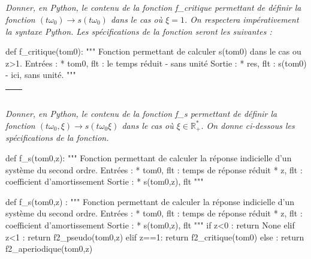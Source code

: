 \documentclass[10pt]{article}
\newif\ifprof
\begin{document}
\subparagraph{} \textit{Donner, en Python, le contenu de la fonction \textsf{f\_critique} permettant de définir la fonction $(t\omega_0) \rightarrow s(t\omega_0)$ dans le cas où $\xi=1$. On respectera impérativement la syntaxe Python. Les spécifications de la fonction seront les suivantes : }
\ifprof
\else
\begin{py}
\begin{python}
def f_critique(tom0):
    """
    Fonction permettant de calculer s(tom0) dans le cas ou z>1. 
    Entrées :
        * tom0, flt : le temps réduit - sans unité
    Sortie : 
        * res, flt : s(tom0) - ici, sans unité.
    """
\end{python}
\end{py}
\fi
\ifprof
\begin{corrige}
\begin{py}
\begin{python}
def f_critique(tom0):
    """
    Fonction permettant de calculer s(t) dans le cas ou z>1. 
    Entrées :
        * tom0 flt : le temps réduit - sans unité
    Sortie : 
        * res, flt : s(tom0) - ici, sans unité.
    """
    return 1-(1+tom0)*math.exp(-tom0) 
\end{python}
\end{py}
\end{corrige}
\else

\begin{tabular}{|p{}|}
\hline
$$\quad$$
\vspace{1cm}
$$\quad$$ \\
\hline
\end{tabular}
\fi

\subparagraph{} \textit{Donner, en Python, le contenu de la fonction \textsf{f\_s} permettant de définir la fonction $(t\omega_0,\xi) \rightarrow s(t\omega_0\xi)$ dans le cas où $\xi\in \mathbb{R}_+^*$. On donne ci-dessous les spécifications de la fonction.}
\ifprof
\else
\begin{py}
\begin{python}
def f_s(tom0,z):
    """
    Fonction permettant de calculer la réponse indicielle d'un système du second ordre. 
    Entrées : 
        * tom0, flt : temps de réponse réduit
        * z, flt : coefficient d'amortissement
    Sortie : 
        * s(tom0,z), flt
    """
\end{python}
\end{py}
\fi

\ifprof
\begin{corrige}
\begin{py}
\begin{python}
def f_s(tom0,z) :
    """
    Fonction permettant de calculer la réponse indicielle d'un système du second ordre. 
    Entrées : 
        * tom0, flt : temps de réponse réduit
        * z, flt : coefficient d'amortissement
    Sortie : 
        * s(tom0,z), flt
    """
    if z<0 :
        return None
    elif z<1 :
        return f2_pseudo(tom0,z)
    elif z==1:
        return f2_critique(tom0)
    else : 
        return f2_aperiodique(tom0,z)
\end{python}
\end{py}
\end{corrige}
\else
\end{document}
